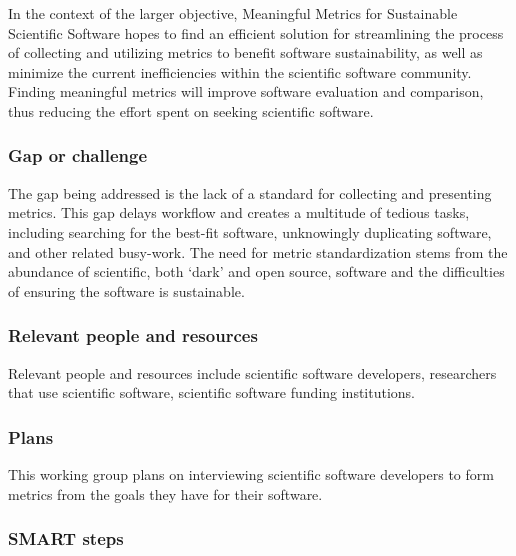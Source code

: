 In the context of the larger objective, Meaningful Metrics for Sustainable Scientific Software hopes to find an efficient solution for streamlining the process of collecting and utilizing metrics to benefit software sustainability, as well as minimize the current inefficiencies within the scientific software community. Finding meaningful metrics will improve software evaluation and comparison, thus reducing the effort spent on seeking scientific software.

\subsubsection{Gap or challenge}


The gap being addressed is the lack of a standard for collecting and presenting metrics. This gap delays workflow and creates a multitude of tedious tasks, including searching for the best-fit software, unknowingly duplicating software, and other related busy-work. The need for metric standardization stems from the abundance of scientific, both `dark' and open source, software and the difficulties of ensuring the software is sustainable. 

\subsubsection{Relevant people and resources}


Relevant people and resources include scientific software developers, researchers that use scientific software, scientific software funding institutions. 

\subsubsection{Plans}


This working group plans on interviewing scientific software developers to form metrics from the goals they have for their software. 

\subsubsection{SMART steps}


